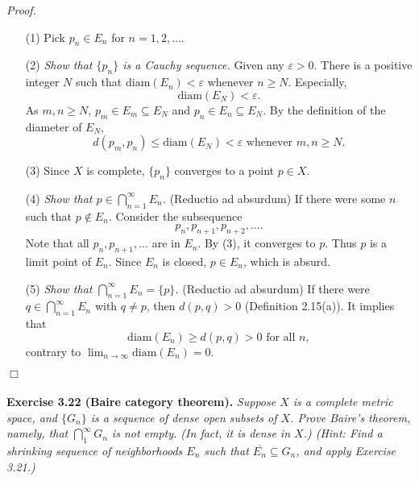 \documentclass{article}
\begin{document}
\emph{Proof.}
\begin{enumerate}
\item[(1)]
Pick $p_n \in E_n$ for $n = 1, 2, \ldots$.
\item[(2)]
\emph{Show that $\{p_n\}$ is a Cauchy sequence.}
Given any $\varepsilon > 0$.
There is a positive integer $N$ such that
$\mathrm{diam}(E_n) < \varepsilon$ whenever $n \geq N$.
Especially, $$\mathrm{diam}(E_N) < \varepsilon.$$
As $m, n \geq N$, $p_m \in E_m \subseteq E_N$ and $p_n \in E_n \subseteq E_N$.
By the definition of the diameter of $E_N$,
$$d(p_m,p_n) \leq \mathrm{diam}(E_N) < \varepsilon \text{ whenever } m,n \geq N.$$
\item[(3)]
Since $X$ is complete, $\{p_n\}$ converges to a point $p \in X$.
\item[(4)]
\emph{Show that $p \in \bigcap_{n=1}^{\infty} E_n$.}
(Reductio ad absurdum)
If there were some $n$ such that $p \not\in E_{n}$.
Consider the subsequence
$$p_{n}, p_{n+1}, p_{n+2}, \ldots.$$
Note that all $p_{n}, p_{n+1}, \ldots$ are in $E_n$.
By (3), it converges to $p$. Thus $p$ is a limit point of $E_n$.
Since $E_n$ is closed, $p \in E_n$, which is absurd.
\item[(5)]
\emph{Show that $\bigcap_{n=1}^{\infty} E_n = \{p\}$.}
(Reductio ad absurdum)
If there were $q \in \bigcap_{n=1}^{\infty} E_n$ with $q \neq p$,
then $d(p,q) > 0$ (Definition 2.15(a)).
It implies that
$$\mathrm{diam}(E_n)
\geq d(p,q) > 0 \text{ for all } n,$$
contrary to $\lim_{n \to \infty} \mathrm{diam}(E_n) = 0$.
\end{enumerate}
$\Box$ \\\\






\textbf{Exercise 3.22 (Baire category theorem).}
\emph{Suppose $X$ is a complete metric space,
and $\{G_n\}$ is a sequence of dense open subsets of $X$.
Prove Baire's theorem, namely, that $\bigcap^\infty_1{G_n}$ is not empty.
(In fact, it is dense in $X$.)
(Hint: Find a shrinking sequence of neighborhoods $E_n$ such
that $\overline{E_n} \subseteq G_n$, and apply Exercise 3.21.) } \\
\end{document}
